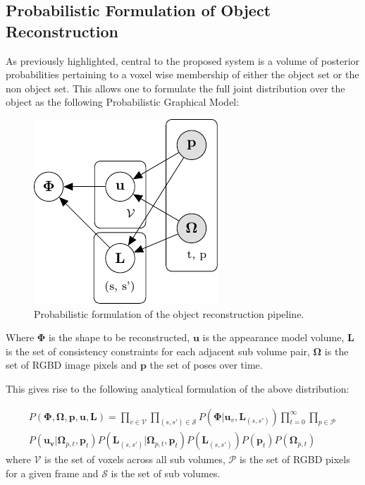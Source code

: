 \subsection{Probabilistic Formulation of Object Reconstruction}
As previously highlighted, central to the proposed system is a volume of posterior probabilities pertaining to a voxel wise membership of either the 
object set or the non object set. This allows one to formulate the full joint distribution over the object as the following Probabilistic 
Graphical Model:
\begin{figure}[h]
	\centering
	\includegraphics{graphical_models/pgm1.pdf}
	\caption{Probabilistic formulation of the object reconstruction pipeline.}
\end{figure}

Where $\mathbf{\Phi}$ is the shape to be reconstructed, $\mathbf{u}$ is the appearance model volume, $\mathbf{L}$ is the 
set of consistency constraints for each adjacent sub volume pair, $\mathbf{\Omega}$ is the set of RGBD image pixels and $\mathbf{p}$ the 
set of poses over time.

This gives rise to the following analytical formulation of the above distribution:

\begin{equation}
\begin{split}
P(\mathbf{\Phi}, \mathbf{\Omega}, \mathbf{p}, \mathbf{u}, \mathbf{L}) = 
\prod_{v \in \mathcal{V}}\prod_{(s, s') \in \mathcal{S}}P(\mathbf{\Phi}|\mathbf{u}_{v}, \mathbf{L}_{(s, s')}) 
\prod_{t=0}^{\infty}\prod_{p \in \mathcal{P}}\\
P(\mathbf{u_{v}}|\mathbf{\Omega}_{p, t}, \mathbf{p}_{t})
P(\mathbf{L}_{(s, s')}|\mathbf{\Omega}_{p, t}, \mathbf{p}_{t})
P(\mathbf{L}_{(s, s')})P(\mathbf{p}_{t})P(\mathbf{\Omega}_{p, t})
\end{split}
\end{equation}
where $\mathcal{V}$ is the set of voxels across all sub volumes, $\mathcal{P}$ is the set of RGBD pixels for a given 
frame and $\mathcal{S}$ is the set of sub volumes.

